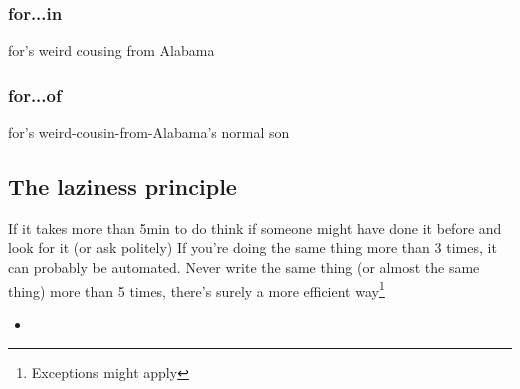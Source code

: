    \subsubsection{for...in}
    \label{subsub:forIn}
for's weird cousing from Alabama

    \subsubsection{for...of}
    \label{subsub:forOf}
for's weird-cousin-from-Alabama's normal son
    
\subsection{The laziness principle}
\label{sub:lazy}
If it takes more than 5min to do think if someone might have done it before and look for it (or ask politely)
If you're doing the same thing more than 3 times, it can probably be automated. Never write the same thing (or almost the same thing) more than 5 times, there's surely a more efficient way\footnote{Exceptions might apply}

\begin{itemize}
    \item
\end{itemize}
